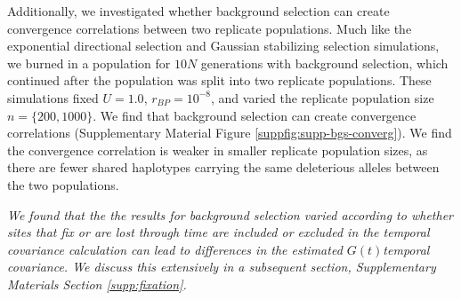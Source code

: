 \documentclass[11pt]{article}
\newcommand{\gc}[1]{{\it \color{red} #1 } }
\begin{document}
{  %


Additionally, we investigated whether background selection can create
convergence correlations between two replicate populations. Much like the
exponential directional selection and Gaussian stabilizing selection
simulations, we burned in a population for $10N$ generations with background
selection, which continued after the population was split into two replicate
populations. These simulations fixed $U = 1.0$, $r_{BP} = 10^{-8}$, and varied
the replicate population size $n = \{200, 1000\}$. We find that background
selection can create convergence correlations (Supplementary Material Figure
\ref{suppfig:supp-bgs-converg}). We find the convergence correlation is weaker
in smaller replicate population sizes, as there are fewer shared haplotypes
carrying the same deleterious alleles between the two populations.

\gc{We found that the the results for background selection varied
  according to whether sites that fix or are lost through
time are included or excluded in the temporal covariance calculation can lead
to differences in the estimated $G(t)$temporal covariance. We discuss
this extensively in a subsequent section, Supplementary Materials Section \ref{supp:fixation}.}



}
\end{document}
